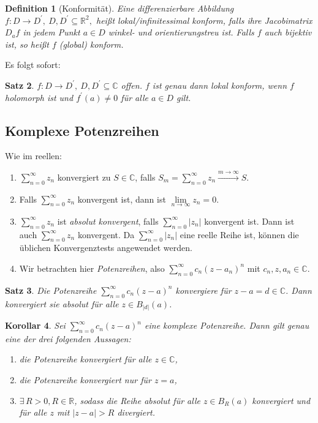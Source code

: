 \documentclass[a4paper,12pt]{article}
\theoremstyle{newthm}
\newtheorem{thm}{Satz}[subsection]
\newtheorem{cor}[thm]{Korollar}
\theoremstyle{newdef}
\newtheorem{defn}[thm]{Definition}
\theoremstyle{newrem}
\newcommand{\R}{\mathbb{R}}
\newcommand{\C}{\mathbb{C}}
\begin{document}
		\begin{defn}[Konformität]
			Eine differenzierbare Abbildung $ f:D \to D^\prime,\ D,D^\prime \subseteq \R^2, $ heißt \emph{lokal/infinitessimal konform}, falls ihre Jacobimatrix $ D_af $ in jedem Punkt $a \in D$ winkel- und orientierungstreu ist. Falls $f$ auch bijektiv ist, so heißt $f$ \emph{(global) konform}.
		\end{defn}
		
		Es folgt sofort:
		\begin{thm}
			$f: D \to D^\prime,\ D,D^\prime \subseteq \C$ offen. $f$ ist genau dann lokal konform, wenn $f$ holomorph ist und $f^\prime(a) \neq 0$ für alle $a \in D$ gilt.
		\end{thm}
		
	
	\subsection{Komplexe Potenzreihen}
		
		Wie im reellen:
		\begin{enumerate}
			\item $ \sum\limits_{n=0}^\infty z_n $ konvergiert zu $S \in \C$, falls $ S_m = \sum\limits_{n=0}^\infty z_n \overset{m \to \infty}{\longrightarrow} S. $
			\item Falls $\sum\limits_{n=0}^\infty z_n $ konvergent ist, dann ist $ \lim\limits_{n \to \infty} z_n = 0. $
			\item  $\sum\limits_{n=0}^\infty z_n $ ist \emph{absolut konvergent}, falls $\sum\limits_{n=0}^\infty |z_n| $ konvergent ist. Dann ist auch $ \sum\limits_{n=0}^\infty z_n $ konvergent. Da $\sum\limits_{n=0}^\infty |z_n| $ eine reelle Reihe ist, können die üblichen Konvergenztests angewendet werden.
			\item Wir betrachten hier \emph{Potenzreihen}, also $\sum\limits_{n=0}^\infty c_n (z-a_n)^n $ mit $ c_n, z, a_n \in \C. $
		\end{enumerate}
		
		\begin{thm}
			Die Potenzreihe $ \sum\limits_{n=0}^\infty c_n (z-a)^n $ konvergiere für $ z-a = d \in \C $. Dann konvergiert sie absolut für alle $ z \in B_{|d|}(a) $.
		\end{thm}
		
		\begin{cor}\label{cor_pot}
			Sei $ \sum\limits_{n=0}^\infty c_n (z-a)^n $ eine komplexe Potenzreihe. Dann gilt genau eine der drei folgenden Aussagen:
			\begin{enumerate}[label={\roman*})]
				\item die Potenzreihe konvergiert für alle $z \in \C$,
				\item die Potenzreihe konvergiert nur für $z = a$,
				\item $ \exists\, R > 0, R \in \R $, sodass die Reihe absolut für alle $z \in B_R(a)$ konvergiert und für alle $ z $ mit $ |z-a|>R $ divergiert.
			\end{enumerate}
		\end{cor}
		
\end{document}
